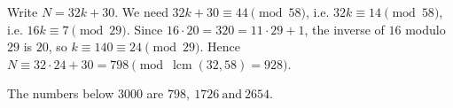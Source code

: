 Write $N=32k+30$. We need $32k+30\equiv44\pmod{58}$, i.e. $32k\equiv14\pmod{58}$, i.e. $16k\equiv7\pmod{29}$. Since $16\cdot20=320=11\cdot29+1$, the inverse of $16$ modulo $29$ is $20$, so $k\equiv140\equiv24\pmod{29}$. Hence $N\equiv32\cdot24+30=798\pmod{\operatorname{lcm}(32,58)=928}$.

The numbers below $3000$ are $\boxed{798,\ 1726\ \text{and}\ 2654}$.
